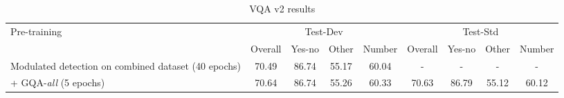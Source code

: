 \begin{table}[h]
\begin{center}
\small
\begin{tabular}{lcccccccc}
 \toprule
 Pre-training & \multicolumn{4}{c}{Test-Dev} & \multicolumn{4}{c}{Test-Std}\\
              & Overall & Yes-no & Other & Number & Overall & Yes-no & Other & Number \\
 \midrule
Modulated detection on combined dataset (40 epochs) & 70.49 & 86.74 & 55.17 & 60.04 & - & - & - & -\\
+ GQA-\textit{all} (5 epochs) & 70.64 & 86.74 & 55.26 & 60.33 & 70.63 & 86.79 & 55.12 & 60.12  \\
 \bottomrule
\end{tabular}
\caption{VQA v2 results
\label{tab:vqa2}}
\end{center}
\end{table}
